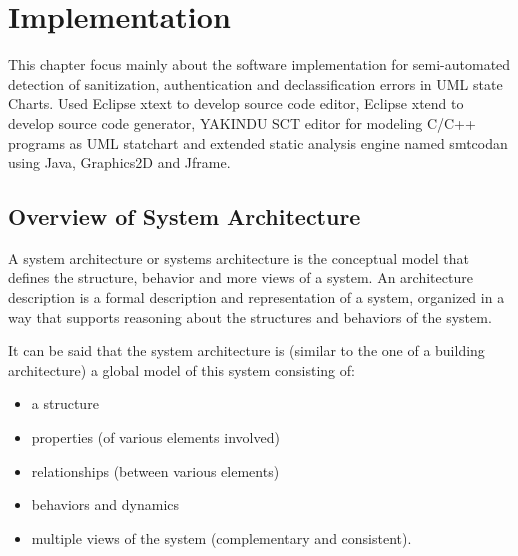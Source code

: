 \chapter{Implementation}
This chapter focus mainly about the software implementation for semi-automated detection of sanitization, authentication and declassification errors in UML state Charts. Used Eclipse xtext to develop source code editor, Eclipse xtend to develop source code generator, YAKINDU SCT editor for modeling C/C++ programs as UML statchart and extended static analysis engine named smtcodan using Java, Graphics2D and Jframe. 

\section{Overview of System Architecture}

A system architecture or systems architecture is the conceptual model that defines the structure, behavior and more views of a system. An architecture description is a formal description and representation of a system, organized in a way that supports reasoning about the structures and behaviors of the system.

It can be said that the system architecture is (similar to the one of a building architecture)  a global model of this system consisting of:
\begin{itemize}
	\item   a structure
	\item	properties (of various elements involved)
	\item	relationships (between various elements)
	\item	behaviors and dynamics
	\item	multiple views of the system (complementary and consistent).
\end{itemize}

